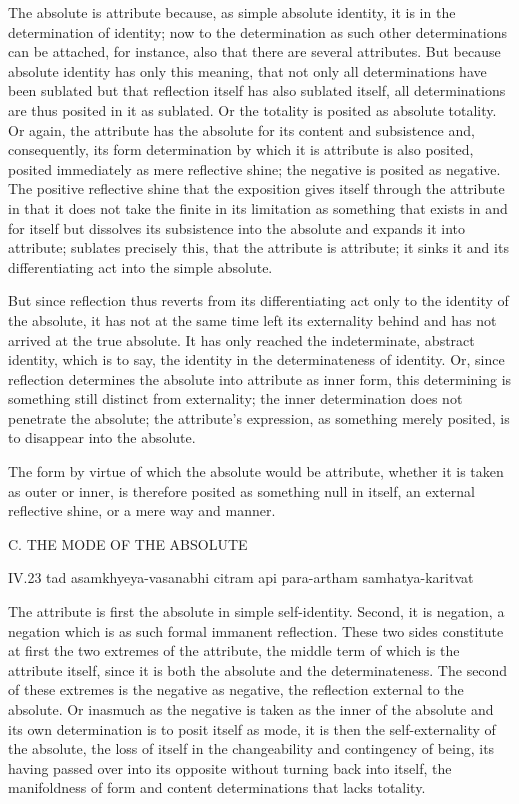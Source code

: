 The absolute is attribute because,
as simple absolute identity,
it is in the determination of identity;
now to the determination as such other determinations can be attached,
for instance, also that there are several attributes.
But because absolute identity has only this meaning,
that not only all determinations have been sublated
but that reflection itself has also sublated itself,
all determinations are thus posited in it as sublated.
Or the totality is posited as absolute totality.
Or again, the attribute has the absolute for its content
and subsistence and, consequently, its form determination
by which it is attribute is also posited, posited immediately
as mere reflective shine; the negative is posited as negative.
The positive reflective shine that the exposition gives itself
through the attribute in that it does not take the finite
in its limitation as something that exists in and for itself
but dissolves its subsistence into the absolute
and expands it into attribute;
sublates precisely this, that the attribute is attribute;
it sinks it and its differentiating act into the simple absolute.

But since reflection thus reverts
from its differentiating act
only to the identity of the absolute,
it has not at the same time left its externality behind
and has not arrived at the true absolute.
It has only reached the indeterminate, abstract identity,
which is to say, the identity in the determinateness of identity.
Or, since reflection determines the absolute into attribute as inner form,
this determining is something still distinct from externality;
the inner determination does not penetrate the absolute;
the attribute's expression, as something merely posited,
is to disappear into the absolute.

The form by virtue of which the absolute would be attribute,
whether it is taken as outer or inner,
is therefore posited as something null in itself,
an external reflective shine, or a mere way and manner.

C. THE MODE OF THE ABSOLUTE

IV.23
tad asamkhyeya-vasanabhi citram api para-artham samhatya-karitvat

The attribute is first the absolute in simple self-identity.
Second, it is negation, a negation which is
as such formal immanent reflection.
These two sides constitute at first the two extremes of the attribute,
the middle term of which is the attribute itself,
since it is both the absolute and the determinateness.
The second of these extremes is the negative as negative,
the reflection external to the absolute.
Or inasmuch as the negative is taken as the inner of the absolute
and its own determination is to posit itself as mode,
it is then the self-externality of the absolute,
the loss of itself in the changeability and contingency of being,
its having passed over into its opposite without turning back into itself,
the manifoldness of form and content determinations that lacks totality.

